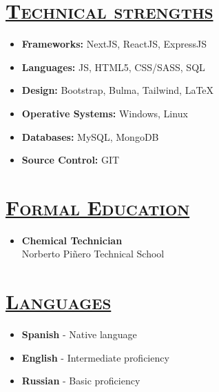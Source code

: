 \documentclass{resume} %
\begin{document}
\vspace{7px}
\begin{multicols}{2}






    
    \section*{\textsc{\underline{Technical strengths}}}
    \begin{itemize}
    \setlength\itemsep{-15px}
        \item \textbf{Frameworks:} NextJS, ReactJS, ExpressJS\\
        \item \textbf{Languages:} JS, HTML5, CSS/SASS, SQL\\
        \item \textbf{Design:} Bootstrap, Bulma, Tailwind, \LaTeX\\
        \item \textbf{Operative Systems:} Windows, Linux\\
        \item \textbf{Databases:} MySQL, MongoDB\\
        \item \textbf{Source Control:} GIT\\
    \end{itemize}

    
    \columnbreak

    \section*{\textsc{\underline{Formal Education}}}
    \begin{itemize}
      \setlength\itemsep{-15px}
      \item \textbf{Chemical Technician}\\\textcolor{light-gray}{Norberto Pi\~nero Technical School}
    \end{itemize}

    \vspace{-15px}
    \section*{\textsc{\underline{Languages}}}
    \begin{itemize}
      \setlength\itemsep{-15px}
        \item \textbf{Spanish} - \textcolor{light-gray}{Native language}
        \item \textbf{English} - \textcolor{light-gray}{Intermediate proficiency}
        \item \textbf{Russian} - \textcolor{light-gray}{Basic proficiency}
      \end{itemize}

    {\bf } 


\end{multicols}
\end{document}

